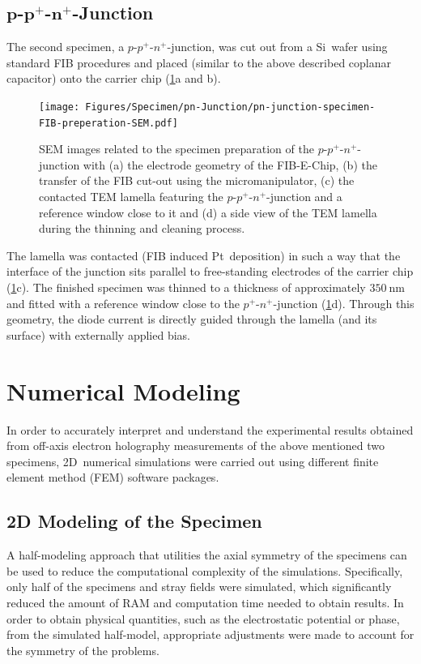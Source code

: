 \subsection[\texorpdfstring{$p$-$p^+$-$n^+$}{\textit{p}-\textit{p}\textsuperscript{+}-\textit{n}\textsuperscript{+}}-Junction]{$\boldsymbol{p}$-$\boldsymbol{p^+}$-$\boldsymbol{n^+}$-Junction} \label{ssec:specimen-preparation-pn-junction}
The second specimen, a $p$-$p^+$-$n^+$-junction, was cut out from a Si~wafer using standard FIB procedures and placed (similar to the above described coplanar capacitor) onto the carrier chip (\cref{fig:pn-junction-specimen-FIB-preperation-SEM}a and b).
\begin{figure}[H]
	\centering
	\texttt{[image: Figures/Specimen/pn-Junction/pn-junction-specimen-FIB-preperation-SEM.pdf]}
	\caption{SEM images related to the specimen preparation of the $p$-$p^+$-$n^+$-junction with (a) the electrode geometry of the FIB-E-Chip, (b) the transfer of the FIB cut-out using the micromanipulator, (c) the contacted TEM lamella featuring the $p$-$p^+$-$n^+$-junction and a reference window close to it and (d) a side view of the TEM lamella during the thinning and cleaning process.}
	\label{fig:pn-junction-specimen-FIB-preperation-SEM}
\end{figure}
The lamella was contacted (FIB induced Pt~deposition) in such a way that the interface of the junction sits parallel to free-standing electrodes of the carrier chip (\cref{fig:pn-junction-specimen-FIB-preperation-SEM}c). The finished specimen was thinned to a thickness of approximately $\SI{350}{\nm}$ and fitted with a reference window close to the $p^+$-$n^+$-junction (\cref{fig:pn-junction-specimen-FIB-preperation-SEM}d). Through this geometry, the diode current is directly guided through the lamella (and its surface) with externally applied bias.
\newpage
\section{Numerical Modeling} \label{sec:numerical-modeling}
In order to accurately interpret and understand the experimental results obtained from off-axis electron holography measurements of the above mentioned two specimens, 2D~numerical simulations were carried out using different finite element method (FEM) software packages.
\subsection{2D Modeling of the Specimen} \label{ssec:2d-modeling-specimen}
A half-modeling approach that utilities the axial symmetry of the specimens can be used to reduce the computational complexity of the simulations. Specifically, only half of the specimens and stray fields were simulated, which significantly reduced the amount of RAM and computation time needed to obtain results. In order to obtain physical quantities, such as the electrostatic potential or phase, from the simulated half-model, appropriate adjustments were made to account for the symmetry of the problems.

